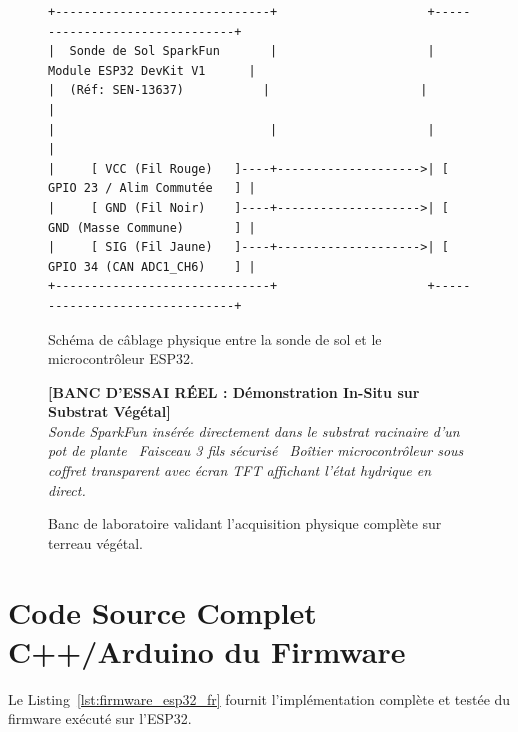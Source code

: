 \documentclass[11pt,a4paper,oneside]{report}
\begin{document}
\begin{figure}[h!]
\centering
\begin{verbatim}
+------------------------------+                     +-------------------------------+
|  Sonde de Sol SparkFun       |                     |   Module ESP32 DevKit V1      |
|  (Réf: SEN-13637)           |                     |                               |
|                              |                     |                               |
|     [ VCC (Fil Rouge)   ]----+-------------------->| [ GPIO 23 / Alim Commutée   ] |
|     [ GND (Fil Noir)    ]----+-------------------->| [ GND (Masse Commune)       ] |
|     [ SIG (Fil Jaune)   ]----+-------------------->| [ GPIO 34 (CAN ADC1_CH6)    ] |
+------------------------------+                     +-------------------------------+
\end{verbatim}
\caption{Schéma de câblage physique entre la sonde de sol et le microcontrôleur ESP32.}
\label{fig:schema_cablage_fr}
\end{figure}

\begin{figure}[h!]
\centering
\begin{tcolorbox}[enhanced,colback=white,colframe=nasablue,width=0.75\linewidth,arc=2mm]
\centering
\textbf{[BANC D'ESSAI RÉEL : Démonstration In-Situ sur Substrat Végétal]}\\[0.2cm]
\textit{Sonde SparkFun insérée directement dans le substrat racinaire d'un pot de plante \textbar\ Faisceau 3 fils sécurisé \textbar\ Boîtier microcontrôleur sous coffret transparent avec écran TFT affichant l'état hydrique en direct.}
\end{tcolorbox}
\caption{Banc de laboratoire validant l'acquisition physique complète sur terreau végétal.}
\label{fig:banc_essai_fr}
\end{figure}

\section{Code Source Complet C++/Arduino du Firmware}
Le Listing~\ref{lst:firmware_esp32_fr} fournit l'implémentation complète et testée du firmware exécuté sur l'ESP32.
\end{document}
